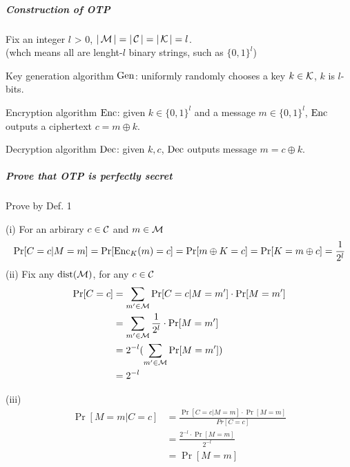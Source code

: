 \subparagraph{Construction of OTP}

Fix an integer \(l\) > 0, \(|\operatorname{\mathcal{M}}| = |\operatorname{\mathcal{C}}| = |\operatorname{\mathcal{K}}| = l\). \\
(whch means all are lenght-\(l\) binary strings, such as \(\{0, 1\}^l\))

Key generation algorithm \(\operatorname{Gen}\): uniformly randomly chooses a key \(k \in \operatorname{\mathcal{K}}\), \(k\) is \(l\)-bits.

Encryption algorithm \(\operatorname{Enc}\): given \(k \in \{0, 1\}^l\) and a message \(m \in \{0, 1\}^l\), \(\operatorname{Enc}\) outputs a ciphertext \(c = m \oplus k\).

Decryption algorithm \(\operatorname{Dec}\): given \(k, c\), \(\operatorname{Dec}\) outputs message \(m = c \oplus k\).

\subparagraph{Prove that OTP is perfectly secret}

Prove by Def. 1

(i) For an arbirary \(c \in \operatorname{\mathcal{C}}\) and \(m \in \operatorname{\mathcal{M}}\) \\
\[ \Pr[C = c | M = m] = \Pr[\operatorname{Enc}_K(m) = c] = \Pr[m \oplus K = c] = \Pr[K = m \oplus c] = \frac{1}{2^l}\]
(ii) Fix any \(\operatorname{dist}(\operatorname{\mathcal{M}})\), for any \(c \in \operatorname{\mathcal{C}}\)
\begin{align*}
	\Pr [C = c] &= \sum_{m' \in \operatorname{\mathcal{M}}} \Pr[C = c | M = m'] \cdot \Pr[M = m'] \\
	&= \sum_{m' \in \operatorname{\mathcal{M}}} \frac{1}{2^l} \cdot \Pr[M = m'] \\
	&= 2^{-l} (\sum_{m' \in \operatorname{\mathcal{M}}} \Pr[M = m']) \\
	&= 2^{-l}
\end{align*}

(iii)
\begin{align*}
	\Pr[M = m | C = c] &= \frac{\Pr[C = c | M = m] \cdot \Pr[M = m]}{Pr[C = c]} \\
	&= \frac{2^{-l} \cdot \Pr[M = m]}{2^{-l}} \\
	&= \Pr[M = m]
\end{align*}

